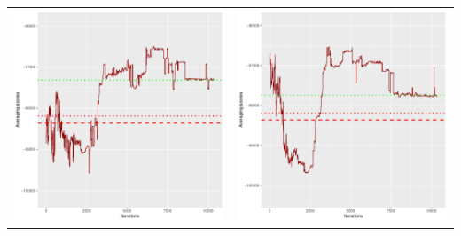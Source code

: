\documentclass[]{scrartcl}
\begin{document}
\begin{table}[h!]
\begin{tabular}{cc}
\includegraphics[scale = 0.4]{./figs/hepar2/v2/25/avgBoundsEvolution-10352.pdf} & 
\includegraphics[scale = 0.4]{./figs/hepar2/v2/50/avgBoundsEvolution-10352.pdf} \\

\end{tabular}
\end{table}
\end{document}
